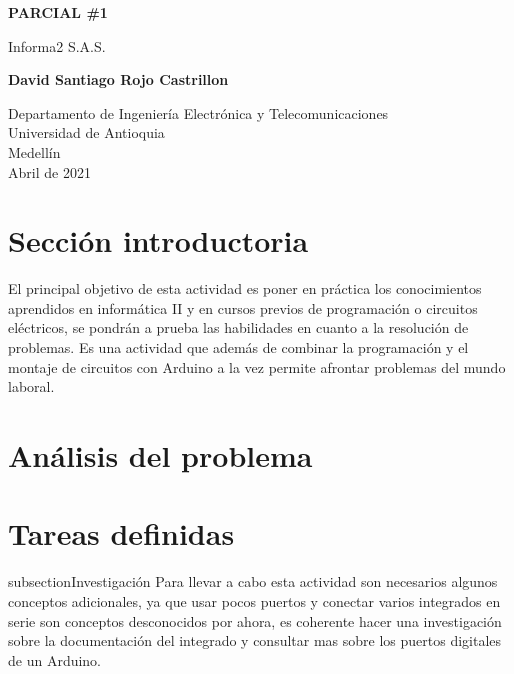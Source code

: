 \documentclass{article}
\begin{document}
\begin{titlepage}
    \begin{center}
        \vspace*{1cm}
            
        \Huge
        \textbf{PARCIAL \#1}
            
        \vspace{0.5cm}
        \LARGE
        Informa2 S.A.S.
            
        \vspace{1.5cm}
            
        \textbf{David Santiago Rojo Castrillon}
            
        \vfill
            
        \vspace{0.8cm}
            
        \Large
        Departamento de Ingeniería Electrónica y Telecomunicaciones\\
        Universidad de Antioquia\\
        Medellín\\
        Abril de 2021
            
    \end{center}
\end{titlepage}

\tableofcontents
\newpage
\section{Sección introductoria}\label{intro}
El principal objetivo de esta actividad es poner en práctica los conocimientos aprendidos en informática II y en cursos previos de programación o circuitos eléctricos, se pondrán a prueba las habilidades en cuanto a la resolución de problemas. Es una actividad que además de combinar la programación y el montaje de circuitos con Arduino a la vez permite afrontar problemas del mundo laboral.

\section{Análisis del problema} \label{contenido}

\section{Tareas definidas} \label{contenido}
subsection{Investigación}
Para llevar a cabo esta actividad son necesarios algunos conceptos adicionales, ya que usar pocos puertos y conectar varios integrados en serie son conceptos desconocidos por ahora, es coherente hacer una investigación sobre la documentación del integrado y consultar mas sobre los puertos digitales de un Arduino.
\end{document}
